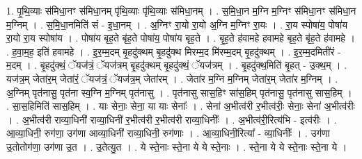 \documentclass[17pt]{extarticle}
\begin{document}
1. पृ॒थि॒व्याः स॑मिधा॒नꣳ स॑मिधा॒नम् पृ॑थि॒व्याः पृ॑थि॒व्याः स॑मिधा॒नम् । . स॒मि॒धा॒न म॒ग्नि म॒ग्निꣳ स॑मिधा॒नꣳ स॑मिधा॒न म॒ग्निम् । . स॒मि॒धा॒नमिति॑ सं - इ॒धा॒नम् । . अ॒ग्निꣳ रा॒यो रा॒यो अ॒ग्नि म॒ग्निꣳ रा॒यः । . रा॒य स्पोषा॑य॒ पोषा॑य रा॒यो रा॒य स्पोषा॑य । . पोषा॑य बृह॒ते बृ॑ह॒ते पोषा॑य॒ पोषा॑य बृह॒ते । . बृ॒ह॒ते ह॑वामहे हवामहे बृह॒ते बृ॑ह॒ते ह॑वामहे । . ह॒वा॒म॒ह॒ इति॑ हवामहे । . इ॒र॒म्म॒दम् बृ॒हदु॑क्थम् बृ॒हदु॑क्थ मिरम्म॒द मि॑रम्म॒दम् बृ॒हदु॑क्थम् । . इ॒र॒म्म॒दमिती॑रं - म॒दम् । . बृ॒हदु॑क्थं॒ ॅयज॑त्रं॒ ॅयज॑त्रम् बृ॒हदु॑क्थम् बृ॒हदु॑क्थं॒ ॅयज॑त्रम् । . बृ॒हदु॑क्थ॒मिति॑ बृ॒हत् - उ॒क्थ॒म् । . यज॑त्र॒म् जेता॑र॒म् जेता॑रं॒ ॅयज॑त्रं॒ ॅयज॑त्र॒म् जेता॑रम् । . जेता॑र म॒ग्नि म॒ग्निम् जेता॑र॒म् जेता॑र म॒ग्निम् । . अ॒ग्निम् पृत॑नासु॒ पृत॑ना स्व॒ग्नि म॒ग्निम् पृत॑नासु । . पृत॑नासु सास॒हिꣳ सा॑स॒हिम् पृत॑नासु॒ पृत॑नासु सास॒हिम् । . सा॒स॒हिमिति॑ सास॒हिम् । . याः सेनाः॒ सेना॒ या याः सेनाः᳚ । . सेना॑ अ॒भीत्व॑री र॒भीत्व॑रीः॒ सेनाः॒ सेना॑ अ॒भीत्व॑रीः । . अ॒भीत्व॑री राव्या॒धिनी॑ राव्या॒धिनी॑ र॒भीत्व॑री र॒भीत्व॑री राव्या॒धिनीः᳚ । . अ॒भीत्व॑री॒रित्य॑भि - इत्व॑रीः । . आ॒व्या॒धिनी॒ रुग॑णा॒ उग॑णा आव्या॒धिनी॑ राव्या॒धिनी॒ रुग॑णाः । . आ॒व्या॒धिनी॒रित्या᳚ - व्या॒धिनीः᳚ । . उग॑णा उ॒तोतोग॑णा॒ उग॑णा उ॒त । . उ॒तेत्यु॒त । . ये स्ते॒नाः स्ते॒ना ये ये स्ते॒नाः । . स्ते॒ना ये ये स्ते॒नाः स्ते॒ना ये । \newline
\end{document}

